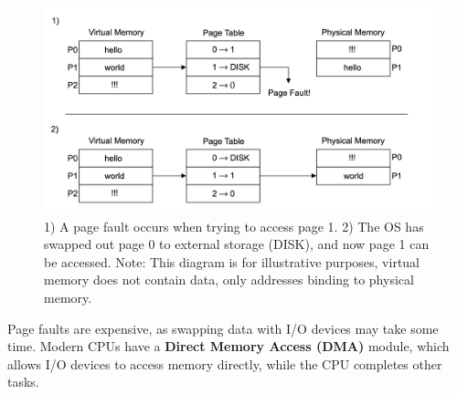 \vspace{-2em}
\begin{figure}[h]
    \centering
    \includegraphics[width=\textwidth]{Sections/virt/pagefault.png}
    
    \vspace{1em}
    \caption{
        1) A page fault occurs when trying to access page 1. 2) The OS has swapped out page 0 to external storage (DISK), and now page 1 can be accessed.
        Note: This diagram is for illustrative purposes, virtual memory does not contain data, only addresses binding to physical memory.
        }

    \label{fig:virt6}
\end{figure}

\begin{Def}

    Page faults are expensive, as swapping data with I/O devices may take some time. Modern CPUs have a \textbf{Direct Memory Access (DMA)} module, which allows I/O devices to access memory directly, while the CPU completes other tasks. 
\end{Def}

